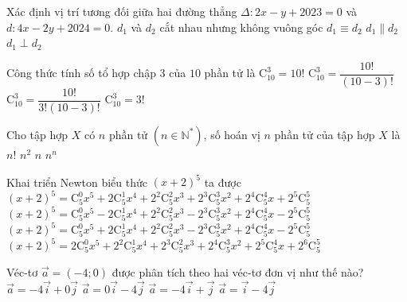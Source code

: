 \begin{ex}%
	Xác định vị trí tương đối giữa hai đường thẳng $\Delta \colon 2x-y+2023=0$ và $d \colon 4x-2y+2024=0$.	
	\choice
	{$d_1$ và $d_2$ cắt nhau nhưng không vuông góc}
	{$d_1 \equiv d_2$}
	{\True $d_1 \parallel d_2$}
	{$d_1 \perp d_2$}
\end{ex}
\begin{ex}%
	Công thức tính số tổ hợp chập $3$ của $10$ phần tử là	
	\choice
	{$\mathrm{C}_{10}^3=10!$}
	{$\mathrm{C}_{10}^3=\dfrac{10!}{(10-3)!}$}
	{\True $\mathrm{C}_{10}^3=\dfrac{10!}{3!(10-3)!}$}
	{$\mathrm{C}_{10}^3=3!$}
\end{ex}
\begin{ex}%
	Cho tập hợp $X$ có $n$ phần tử $(n \in \mathbb{N}^*)$, số hoán vị $n$ phần tử của tập hợp $X$ là	
	\choice
	{\True $n!$}
	{$n^2$}
	{$n$}
	{$n^n$}
\end{ex}
\begin{ex}%
	Khai triển Newton biểu thức $(x+2)^5$ ta được	
	\choice
	{\True $(x+2)^5=\mathrm{C}_5^0 x^5 + 2\mathrm{C}_5^1x^4+ 2^2\mathrm{C}_5^2x^3+2^3\mathrm{C}_5^3x^2+2^4\mathrm{C}_5^4x+2^5\mathrm{C}_5^5$}
	{$(x+2)^5=\mathrm{C}_5^0 x^5 - 2\mathrm{C}_5^1x^4+ 2^2\mathrm{C}_5^2x^3-2^3\mathrm{C}_5^3x^2+2^4\mathrm{C}_5^4x-2^5\mathrm{C}_5^5$}
	{$(x+2)^5=\mathrm{C}_5^0 x^5 + 2\mathrm{C}_5^1x^4+ 2^2\mathrm{C}_5^2x^3-2^3\mathrm{C}_5^3x^2+2^4\mathrm{C}_5^4x-2^5\mathrm{C}_5^5$}
	{$(x+2)^5=2\mathrm{C}_5^0 x^5 + 2^2\mathrm{C}_5^1x^4+ 2^3\mathrm{C}_5^2x^3+2^4\mathrm{C}_5^3x^2+2^5\mathrm{C}_5^4x+2^6\mathrm{C}_5^5$}
\end{ex}
\begin{ex}%
	Véc-tơ $\overrightarrow{a}=(-4;0)$ được phân tích theo hai véc-tơ đơn vị như thế nào?	
	\choice
	{\True $\overrightarrow{a}=-4\overrightarrow{i}+0\overrightarrow{j}$}
	{$\overrightarrow{a}=0\overrightarrow{i}-4\overrightarrow{j}$}
	{$\overrightarrow{a}=-4\overrightarrow{i}+\overrightarrow{j}$}
	{$\overrightarrow{a}=\overrightarrow{i}-4\overrightarrow{j}$}
\end{ex}
